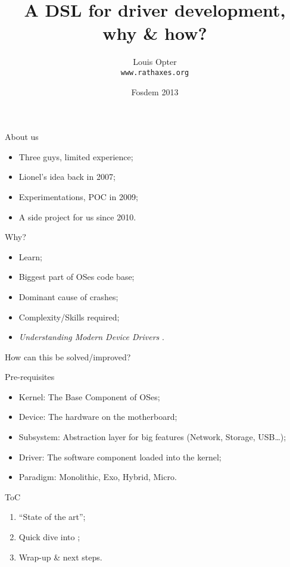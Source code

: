 \documentclass[xcolor={usenames,svgnames}]{beamer}
\title{A DSL for driver development, why \& how?}
\date{Fosdem 2013}
\author{Louis Opter \\ \texttt{www.rathaxes.org}}
\begin{document}
\begin{frame}
\titlepage
\end{frame}

\begin{frame}{About us}
\Large{
\begin{itemize}
\item<1-> Three guys, limited experience;
\item<2-> Lionel's idea back in 2007;
\item<3-> Experimentations, POC in 2009;
\item<4-> A side project for us since 2010.
\end{itemize}
}
\end{frame}

\begin{frame}{Why?}
\Large{
\begin{itemize}
\item Learn;
\item Biggest part of OSes code base;
\item Dominant cause of crashes;
\item Complexity/Skills required;
\pause
\item \emph{Understanding Modern Device Drivers} \cite{kadavasplos12}.
\end{itemize}
\pause

\begin{center}
How can this be solved/improved?
\end{center}
}
\end{frame}

\begin{frame}{Pre-requisites}
\begin{itemize}
\item Kernel: The Base Component of OSes;
\item Device: The hardware on the motherboard;
\item Subsystem: Abstraction layer for big features (Network, Storage, USB\ldots);
\item Driver: The software component loaded into the kernel;
\item Paradigm: Monolithic, Exo, Hybrid, Micro.
\end{itemize}
\end{frame}

\begin{frame}{ToC}
\Large{
\begin{enumerate}
\item “State of the art”;
\item Quick dive into \rtx;
\item Wrap-up \& next steps.
\end{enumerate}
}
\end{frame}
\end{document}
